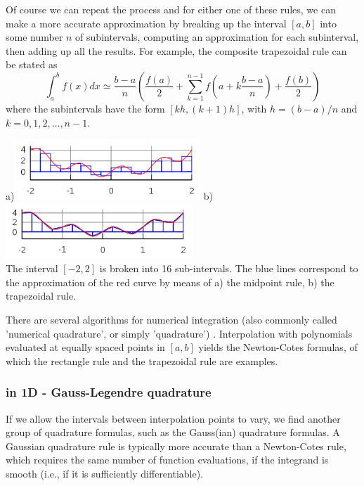 Of course we can repeat the process and for either one of these rules, 
we can make a more accurate approximation by 
breaking up the interval $[a,b]$ into some number $n$ of subintervals, computing 
an approximation for each subinterval, then adding up all the results. 
For example, 
the composite trapezoidal rule can be stated as
\begin{equation}
\int_a^b f(x)dx \simeq \frac{b-a}{n} \left( \frac{f(a)}{2}  
+\sum_{k=1}^{n-1} f\left(a+k\frac{b-a}{n}\right)
   +\frac{f(b)}{2} \right)
\end{equation}
where the subintervals have the form $[kh,(k+1)h]$, with $h=(b-a)/n$ and $k=0,1,2,\dots,n-1$.


\begin{center}
a)\includegraphics[width=7cm]{images/quadrature/int1}
b)\includegraphics[width=7cm]{images/quadrature/int2}\\
The interval $[-2,2]$ is broken into 16 sub-intervals. The blue lines correspond to the 
approximation of the red curve by means of a) the midpoint rule,  b) the trapezoidal rule.
\end{center}

There are several algorithms for numerical integration (also commonly called 'numerical quadrature', or
simply 'quadrature') .
Interpolation with polynomials evaluated at equally spaced points in $[a,b]$
yields the Newton-Cotes formulas, of which the rectangle rule and the trapezoidal rule are examples. 

\subsubsection{in 1D - Gauss-Legendre quadrature  \label{sec:quad1Dglq}}

If we allow the intervals between interpolation points to vary, we find another group of quadrature formulas, such as 
the Gauss(ian) quadrature formulas. 
A Gaussian quadrature rule is typically more accurate than a Newton-Cotes rule, 
which requires the same number of function evaluations, if the integrand is smooth 
(i.e., if it is sufficiently differentiable).


